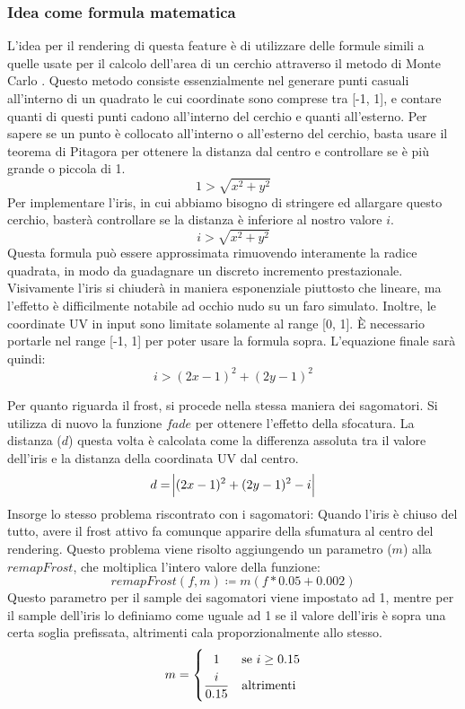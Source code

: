 \documentclass[main.tex]{subfiles}
\begin{document}
\subsubsection{Idea come formula matematica}\label{subsec:5_2_IrisMath}
L'idea per il rendering di questa feature è di utilizzare delle formule simili a quelle usate per il calcolo dell'area di un cerchio attraverso il metodo di Monte Carlo \cite{circleMonteCarlo}. Questo metodo consiste essenzialmente nel generare punti casuali all'interno di un quadrato le cui coordinate sono comprese tra [-1, 1], e contare quanti di questi punti cadono all'interno del cerchio e quanti all'esterno. Per sapere se un punto è collocato all'interno o all'esterno del cerchio, basta usare il teorema di Pitagora per ottenere la distanza dal centro e controllare se è più grande o piccola di 1.
\[1 > \sqrt{x^2 + y^2}\]
Per implementare l'iris, in cui abbiamo bisogno di stringere ed allargare questo cerchio, basterà controllare se la distanza è inferiore al nostro valore $i$.
\[i > \sqrt{x^2 + y^2}\]
Questa formula può essere approssimata rimuovendo interamente la radice quadrata, in modo da guadagnare un discreto incremento prestazionale. Visivamente l'iris si chiuderà in maniera esponenziale piuttosto che lineare, ma l'effetto è difficilmente notabile ad occhio nudo su un faro simulato. \newline
Inoltre, le coordinate UV in input sono limitate solamente al range [0, 1]. È necessario portarle nel range [-1, 1] per poter usare la formula sopra. \newline
L'equazione finale sarà quindi:
\[i > (2x - 1)^2 + (2y - 1)^2\]
\newline

Per quanto riguarda il frost, si procede nella stessa maniera dei sagomatori. Si utilizza di nuovo la funzione $fade$ per ottenere l'effetto della sfocatura. La distanza ($d$) questa volta è calcolata come la differenza assoluta tra il valore dell'iris e la distanza della coordinata UV dal centro.
\[d = \abs{(2x - 1)^2 + (2y - 1)^2 - i}\]
Insorge lo stesso problema riscontrato con i sagomatori: Quando l'iris è chiuso del tutto, avere il frost attivo fa comunque apparire della sfumatura al centro del rendering. Questo problema viene risolto aggiungendo un parametro ($m$) alla $remapFrost$, che moltiplica l'intero valore della funzione:
\[remapFrost(f, m) \coloneqq m(f * 0.05 + 0.002)\]
Questo parametro per il sample dei sagomatori viene impostato ad 1, mentre per il sample dell'iris lo definiamo come uguale ad 1 se il valore dell'iris è sopra una certa soglia prefissata, altrimenti cala proporzionalmente allo stesso.
\[m = 
    \begin{dcases}
        \hfil 1 & \text{se } i \geq 0.15\\
        \frac{i}{0.15} & \text{altrimenti}
    \end{dcases}
\]
\end{document}
